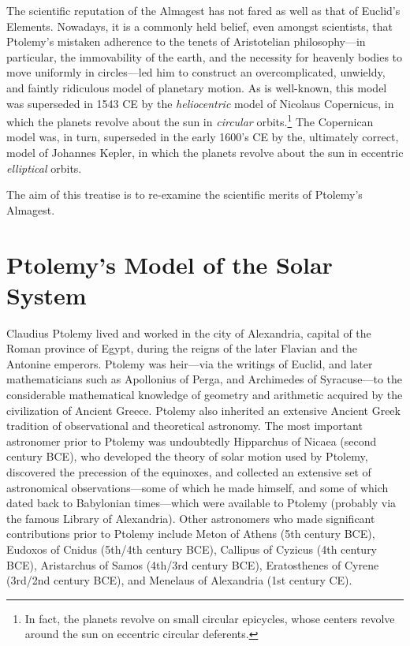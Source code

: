 The scientific reputation of the Almagest has not fared  as well
as that of
Euclid's Elements. Nowadays, it is a commonly held belief, even amongst scientists,  that Ptolemy's mistaken adherence to the
 tenets of Aristotelian philosophy---in particular, the immovability of the earth, and
 the necessity for heavenly bodies to move uniformly in circles---led him to
 construct an overcomplicated,  unwieldy, and faintly ridiculous model of planetary motion. As is well-known, this model was superseded  in 1543 CE by the {\em heliocentric}\/ model of 
 Nicolaus Copernicus, in which the planets revolve about the
 sun in {\em circular}\/ orbits.\footnote{In fact, the planets revolve on small circular epicycles, whose centers revolve around
 the sun on eccentric circular deferents.} The Copernican model was, in turn,
 superseded in the early 1600's CE by the, ultimately correct, model
 of Johannes Kepler, in which the planets revolve about the sun in eccentric 
 {\em elliptical} orbits.
 
 The aim of this treatise is to re-examine the scientific merits
 of Ptolemy's Almagest. 

 \section{Ptolemy's Model of the Solar System}
 Claudius Ptolemy lived and worked in the city of Alexandria, capital of the Roman
 province of Egypt, during the reigns of the later Flavian and 
 the Antonine emperors. Ptolemy was heir---via the writings of Euclid, and later mathematicians
 such as Apollonius of Perga, and Archimedes of Syracuse---to the considerable mathematical
 knowledge of geometry and arithmetic acquired by the civilization of Ancient Greece. Ptolemy
  also inherited an extensive Ancient Greek tradition of observational and theoretical astronomy. The most important astronomer
 prior to Ptolemy was undoubtedly Hipparchus of Nicaea (second century BCE), who developed the theory of solar motion used by Ptolemy, discovered
 the precession of the equinoxes, and collected  an extensive set of astronomical
 observations---some of which he made himself, and
 some of which dated back to Babylonian times---which were
 available to Ptolemy (probably via the famous Library of Alexandria).
 Other astronomers who made significant contributions prior
 to Ptolemy include Meton of Athens (5th century BCE),  Eudoxos of Cnidus (5th/4th century BCE), Callipus of Cyzicus (4th century BCE), Aristarchus of Samos (4th/3rd century BCE),  
 Eratosthenes of Cyrene (3rd/2nd century BCE), and Menelaus
 of Alexandria (1st century CE).
 
